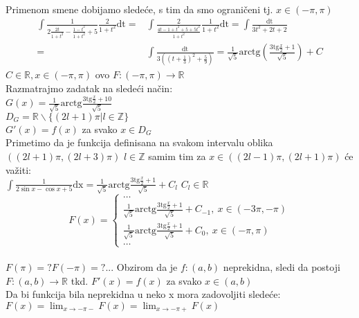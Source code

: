 \documentclass{article}
\begin{document}
Primenom smene dobijamo sledeće, s tim da smo ograničeni tj. $x \in (-\pi, \pi)$\\
\begin{align*}
    \int\frac{1}{2\frac{2t}{1+t^2}-\frac{1-t^2}{1+t^2}+5}\frac{2}{1+t^2}\text{dt}
    = & \int\frac{2}{\frac{4t-1+t^2+5+5t^2}{1+t^2}}\frac{1}{1+t^2}\text{dt}
    =\int\frac{\text{dt}}{3t^2+2t+2}                                        \\
    = & \int\frac{\text{dt}}{3((t+\frac{1}{3})^2 + \frac{5}{9})}
    =\frac{1}{\sqrt{5}}\text{arctg}(\frac{3\text{tg}\frac{x}{2}+1}{\sqrt{5}}) + C
\end{align*}
$C \in \mathbb{R}, x\in(-\pi, \pi)$ ovo $F:(-\pi,\pi)\longrightarrow\mathbb{R}$\\
Razmatrajmo zadatak na sledeći način:\\
$G(x) = \frac{1}{\sqrt{5}}\text{arctg}\frac{3\text{tg}\frac{x}{2}+10}{\sqrt{5}}$\\
$D_G = \mathbb{R}\backslash\{(2l+1)\pi | l \in \mathbb{Z}\}$\\
$G'(x) = f(x)$ za svako $x \in D_G$\\
Primetimo da je funkcija definisana na svakom intervalu oblika $((2l+1)\pi, (2l+3)\pi)$ $l\in\mathbb{Z}$ samim tim za $x \in ((2l-1)\pi, (2l+1)\pi)$ će važiti:\\
$\int\frac{1}{2\sin{x}-\cos{x}+5}\text{dx} = \frac{1}{\sqrt{5}}\text{arctg}\frac{3\text{tg}\frac{x}{2}+1}{\sqrt{5}} + C_l$ $C_l\in\mathbb{R}$\\
$$
    F(x) =
    \begin{cases}
        \dots \                                                                                               \\
        \frac{1}{\sqrt{5}}\text{arctg}\frac{3\text{tg}\frac{x}{2}+1}{\sqrt{5}} + C_{-1},\ x \in (-3\pi, -\pi) \\
        \frac{1}{\sqrt{5}}\text{arctg}\frac{3\text{tg}\frac{x}{2}+1}{\sqrt{5}} + C_0,\ x \in (-\pi,\pi)       \\
        \dots \
    \end{cases}
$$\\
$F(\pi) = ? F(-\pi) = ? ...$ Obzirom da je $f:(a, b)$ neprekidna, sledi da postoji $F:(a, b) \longrightarrow \mathbb{R}$ tkd. $F'(x) = f(x)$ za svako $x \in (a, b)$\\
Da bi funkcija bila neprekidna u neko x mora zadovoljiti sledeće:\\
$F(x) = \displaystyle{\lim_{x\to-\pi-}}F(x) = \displaystyle{\lim_{x\to-\pi+}}F(x)$\\
\end{document}
